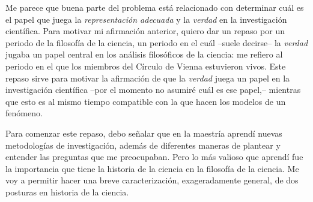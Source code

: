 Me parece que buena parte del problema está relacionado con determinar cuál es el papel que juega la \emph{representación adecuada} y la \emph{verdad} en la investigación científica.
Para motivar mi afirmación anterior, quiero dar un repaso por un periodo de la filosofía de la ciencia, un periodo en el cuál --suele decirse-- la \emph{verdad} jugaba un papel central en los análisis filosóficos de la ciencia: me refiero al periodo en el que los miembros del Círculo de Vienna estuvieron vivos.
Este repaso sirve para motivar la afirmación de que la \emph{verdad} juega un papel en la investigación científica --por el momento no asumiré cuál es ese papel,-- mientras que esto es al mismo tiempo compatible con la  que hacen los modelos de un fenómeno.

Para comenzar este repaso, debo señalar que en la maestría aprendí nuevas metodologías de investigación, además de diferentes maneras de plantear y entender las preguntas que me preocupaban.
Pero lo más valioso que aprendí fue la importancia que tiene la historia de la ciencia en la filosofía de la ciencia. 
Me voy a permitir hacer una breve caracterización, exageradamente general, de dos posturas en historia de la ciencia.
